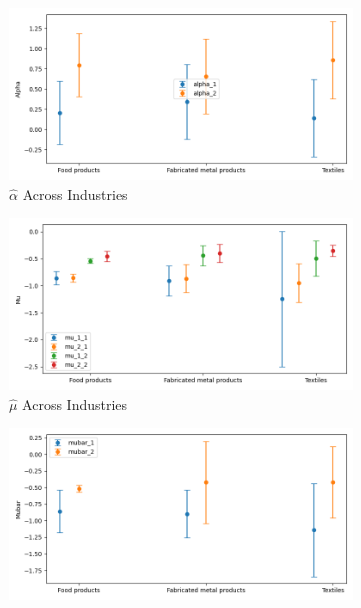 \documentclass{article}
\begin{document}
\begin{figure}[ht!]
    \centering 
    \caption{AR(1) Mixture Model Across Industries}
    \begin{subfigure}[t]{0.32\textwidth}
        \centering
        \includegraphics[width=\textwidth]{figure/ar1_mixture_alpha_across_industries.png}
        \caption{$\hat\alpha$ Across Industries}
    \end{subfigure}
    \begin{subfigure}[t]{0.32\textwidth}
        \centering
        \includegraphics[width=\textwidth]{figure/ar1_mixture_mu_across_industries.png}
        \caption{$\hat\mu$ Across Industries}
    \end{subfigure}
    \begin{subfigure}[t]{0.32\textwidth}
        \centering
        \includegraphics[width=\textwidth]{figure/ar1_mixture_mubar_across_industries.png}

\end{subfigure}
\end{figure}
\end{document}
